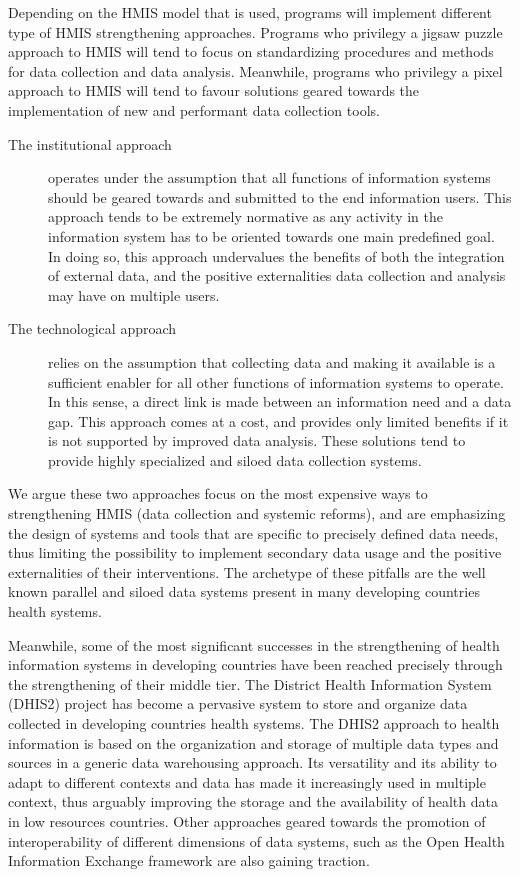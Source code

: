 \documentclass[a4paper,11pt,draft,twoside]{article}
\begin{document}
Depending on the HMIS model that is used, programs will implement different type of HMIS strengthening approaches. Programs who privilegy a jigsaw puzzle approach to HMIS will tend to focus on standardizing procedures and methods for data collection and data analysis. Meanwhile, programs who privilegy a pixel approach to HMIS will tend to favour solutions geared towards the implementation of new and performant data collection tools.

\begin{description}
\item[The institutional approach] operates under the assumption that all functions of information systems should be geared towards and submitted to the end information users. This approach tends to be extremely normative as any activity in the information system has to be oriented towards one main predefined goal. In doing so, this approach undervalues the benefits of both the integration of external data, and the positive externalities data collection and analysis may have on multiple users.

\item[The technological approach] relies on the assumption that collecting data and making it available is a sufficient enabler for all other functions of information systems to operate. In this sense, a direct link is made between an information need and a data gap. This approach comes at a cost, and provides only limited benefits if it is not supported by improved data analysis. These solutions tend to provide highly specialized and siloed data collection systems.
\end{description}

We argue these two approaches focus on the most expensive ways to strengthening HMIS (data collection and systemic reforms), and are emphasizing the design of systems and tools that are specific to precisely defined data needs, thus limiting the possibility to implement secondary data usage and the positive externalities of their interventions. The archetype of these pitfalls are the well known parallel and siloed data systems present in many developing countries health systems.

Meanwhile, some of the most significant successes in the strengthening of health information systems in developing countries have been reached precisely through the strengthening of their middle tier. The District Health Information System (DHIS2) project has become a pervasive system to store and organize data collected in developing countries health systems. The DHIS2 approach to health information is based on the organization and storage of multiple data types and sources in a generic data warehousing approach. Its versatility and its ability to adapt to different contexts and data has made it increasingly used in multiple context, thus arguably improving the storage and the availability of health data in low resources countries. Other approaches geared towards the promotion of interoperability of different dimensions of data systems, such as the Open Health Information Exchange framework are also gaining traction.
\end{document}
